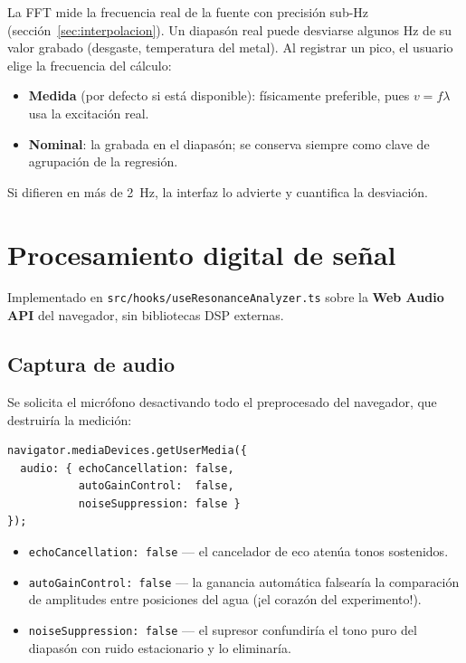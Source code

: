\documentclass[11pt,a4paper]{article}
\begin{document}
La FFT mide la frecuencia real de la fuente con precisión sub-Hz
(sección~\ref{sec:interpolacion}). Un diapasón real puede desviarse algunos Hz de su valor
grabado (desgaste, temperatura del metal). Al registrar un pico, el usuario elige la
frecuencia del cálculo:
\begin{itemize}[nosep]
  \item \textbf{Medida} (por defecto si está disponible): físicamente preferible, pues
        $v = f\lambda$ usa la excitación real.
  \item \textbf{Nominal}: la grabada en el diapasón; se conserva siempre como clave de
        agrupación de la regresión.
\end{itemize}
Si difieren en más de \SI{2}{\hertz}, la interfaz lo advierte y cuantifica la desviación.

\section{Procesamiento digital de señal}

Implementado en \texttt{src/hooks/useResonanceAnalyzer.ts} sobre la \textbf{Web Audio API}
del navegador, sin bibliotecas DSP externas.

\subsection{Captura de audio}

Se solicita el micrófono desactivando todo el preprocesado del navegador, que destruiría la
medición:

\begin{lstlisting}
navigator.mediaDevices.getUserMedia({
  audio: { echoCancellation: false,
           autoGainControl:  false,
           noiseSuppression: false }
});
\end{lstlisting}

\begin{itemize}[nosep]
  \item \texttt{echoCancellation: false} --- el cancelador de eco atenúa tonos sostenidos.
  \item \texttt{autoGainControl: false} --- la ganancia automática falsearía la comparación
        de amplitudes entre posiciones del agua (¡el corazón del experimento!).
  \item \texttt{noiseSuppression: false} --- el supresor confundiría el tono puro del
        diapasón con ruido estacionario y lo eliminaría.
\end{itemize}
\end{document}
